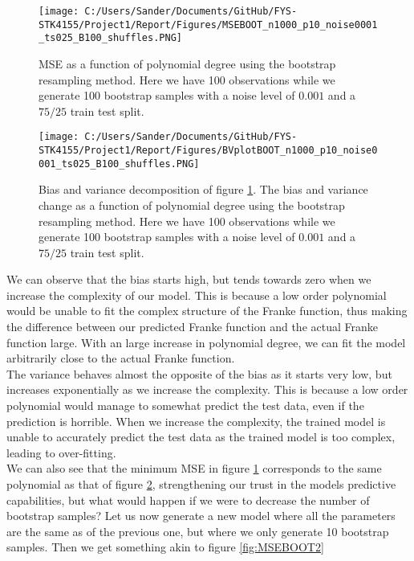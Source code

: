 \documentclass[12pt,a4paper]{article}
\begin{document}
\begin{figure}[H]
\centering
\texttt{[image: C:/Users/Sander/Documents/GitHub/FYS-STK4155/Project1/Report/Figures/MSEBOOT\_n1000\_p10\_noise0001\_ts025\_B100\_shuffles.PNG]}
\caption{\label{fig:MSEBOOT1} MSE as a function of polynomial degree using the bootstrap resampling method. Here we have 100 observations while we generate 100 bootstrap samples with a noise level of $0.001$ and a $75/25$ train test split.}
\end{figure}

\begin{figure}[H]
\centering
\texttt{[image: C:/Users/Sander/Documents/GitHub/FYS-STK4155/Project1/Report/Figures/BVplotBOOT\_n1000\_p10\_noise0001\_ts025\_B100\_shuffles.PNG]}
\caption{\label{fig:BVBOOT1} Bias and variance decomposition of figure \ref{fig:MSEBOOT1}. The bias and variance change as a function of polynomial degree using the bootstrap resampling method. Here we have 100 observations while we generate 100 bootstrap samples with a noise level of $0.001$ and a $75/25$ train test split.}
\end{figure}

\noindent We can observe that the bias starts high, but tends towards zero when we increase the complexity of our model. This is because a low order polynomial would be unable to fit the complex structure of the Franke function, thus making the difference between our predicted Franke function and the actual Franke function large. With an large increase in polynomial degree, we can fit the model arbitrarily close to the actual Franke function. 
\\
The variance behaves almost the opposite of the bias as it starts very low, but increases exponentially as we increase the complexity. This is because a low order polynomial would manage to somewhat predict the test data, even if the prediction is horrible. When we increase the complexity, the trained model is unable to accurately predict the test data as the trained model is too complex, leading to over-fitting. 
\\
We can also see that the minimum MSE in figure \ref{fig:MSEBOOT1} corresponds to the same polynomial as that of figure \ref{fig:BVBOOT1}, strengthening our trust in the models predictive capabilities, but what would happen if we were to decrease the number of bootstrap samples? Let us now generate a new model where all the parameters are the same as of the previous one, but where we only generate 10 bootstrap samples. Then we get something akin to figure \ref{fig:MSEBOOT2}
\end{document}
